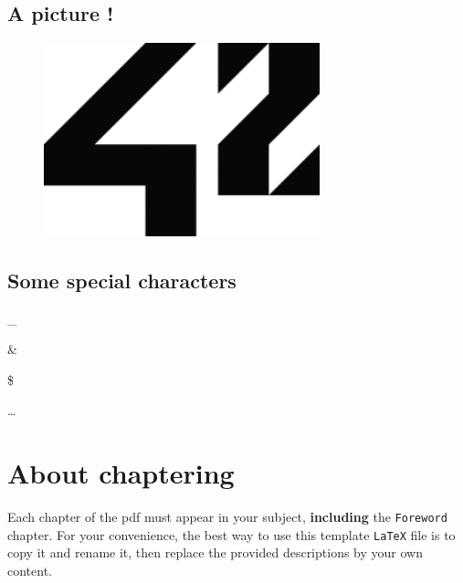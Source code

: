 \documentclass{42-en}
\begin{document}
        \subsection{A picture !}

            \begin{figure}[H]
                \begin{center}
                    \includegraphics[width=8cm]{42.png}
                \end{center}
            \end{figure}


        \newpage


        \subsection{Some special characters}

            \begin{description}\itemsep1pt
                \item [Underscore:] \_
                \item [Ampersand:] \&
                \item [Dollar:] \$
                \item [Elipsis:] \dots
            \end{description}


    \section{About chaptering}

    Each chapter of the pdf must appear in your subject,
    \textbf{including} the \texttt{Foreword} chapter. For your
    convenience, the best way to use this template \texttt{LaTeX} file is
    to copy it and rename it, then replace the provided descriptions by
    your own content.\\

\end{document}
